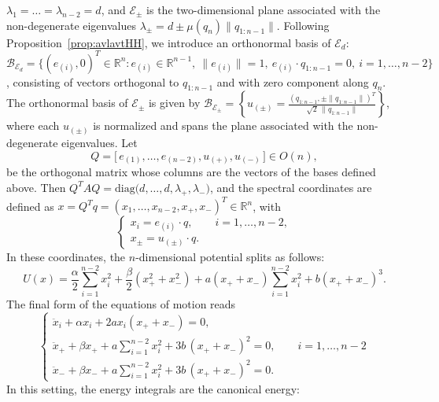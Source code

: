 \documentclass{rendiconti}
\begin{document}
$\lambda_1=\dots=\lambda_{n-2}=d$, and $\mathcal{E}_\pm$ is the two-dimensional plane
associated with the non-degenerate eigenvalues
$\lambda_\pm = d \pm \mu(q_n)\|q_{1:n-1}\|$.
Following Proposition~\ref{prop:avlavtHH}, we introduce an orthonormal basis of
$\mathcal{E}_d$:
$\mathscr{B}_{\mathcal{E}_d} = \bigl\{ (e_{(i)},0)^T \in \mathbb{R}^n :
e_{(i)} \in \mathbb{R}^{n-1},\ \|e_{(i)}\|=1,\ e_{(i)}\cdot q_{1:n-1}=0,\
i=1,\dots,n-2 \bigr\}$,
consisting of vectors orthogonal to $q_{1:n-1}$ and with zero component along
$q_n$.
The orthonormal basis of $\mathcal{E}_\pm$ is given by
$\mathscr{B}_{\mathcal{E}_\pm} =
\left\{
u_{(\pm)} = \frac{(q_{1:n-1}, \pm \|q_{1:n-1}\|)^T}
{\sqrt{2}\,\|q_{1:n-1}\|}
\right\}$,
where each $u_{(\pm)}$ is normalized and spans the plane associated with the
non-degenerate eigenvalues.
Let
\begin{equation}
Q = \bigl[\, e_{(1)}, \dots, e_{(n-2)}, u_{(+)}, u_{(-)} \,\bigr] \in O(n),
\end{equation}
be the orthogonal matrix whose columns are the vectors of the bases defined
above. Then
$Q^T A Q = \mathrm{diag}\bigl(d,\dots,d,\lambda_+,\lambda_-\bigr)$,
and the spectral coordinates are defined as
$x = Q^T q = (x_1, \dots, x_{n-2}, x_+, x_-)^T \in \mathbb{R}^n$,
with
\begin{equation}
\begin{cases}
x_i = e_{(i)}\cdot q, \qquad i=1,\dots,n-2,\\
x_\pm = u_{(\pm)} \cdot q.
\end{cases}
\end{equation}
In these coordinates, the $n$-dimensional potential splits as follows:
\begin{equation}
U(x) =
\frac{\alpha}{2} \sum_{i=1}^{n-2} x_i^2
+ \frac{\beta}{2} \left( x_+^2 + x_-^2 \right)
+ a (x_+ + x_-) \sum_{i=1}^{n-2} x_i^2
+ b (x_+ + x_-)^3.
\end{equation}
The final form of the equations of motion reads
\begin{equation}
\displaystyle
\begin{cases}
\displaystyle
\ddot{x}_i + \alpha x_i + 2 a x_i (x_+ + x_-) = 0,\\
\displaystyle
\ddot{x}_+ + \beta x_+ + a \sum_{i=1}^{n-2} x_i^2 + 3 b \,(x_+ + x_-)^2 = 0,\qquad i=1,\dots,n-2\\
\displaystyle
\ddot{x}_- + \beta x_- + a \sum_{i=1}^{n-2} x_i^2 + 3 b \,(x_+ + x_-)^2 = 0.
\end{cases}
\end{equation}
In this setting, the energy integrals are the canonical energy:
\end{document}
